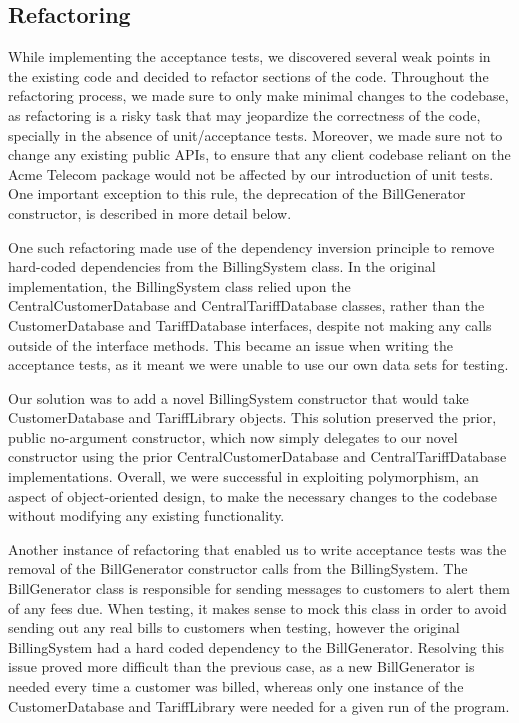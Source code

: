 \documentclass[a4paper]{article}
\begin{document}
\subsection{Refactoring}
While implementing the acceptance tests, we discovered several weak points in the existing code and decided to refactor sections of the code. Throughout the refactoring process, we made sure to only make minimal changes to the codebase, as refactoring is a risky task that may jeopardize the correctness of the code, specially in the absence of unit/acceptance tests. Moreover, we made sure not to change any existing public APIs, to ensure that any client codebase reliant on the Acme Telecom package would not be affected by our introduction of unit tests. One important exception to this rule, the deprecation of the BillGenerator constructor, is described in more detail below.

One such refactoring made use of the dependency inversion principle to remove hard-coded dependencies from the BillingSystem class. In the original implementation, the BillingSystem class relied upon the CentralCustomerDatabase and CentralTariffDatabase classes, rather than the CustomerDatabase and TariffDatabase interfaces, despite not making any calls outside of the interface methods. This became an issue when writing the acceptance tests, as it meant we were unable to use our own data sets for testing. 

Our solution was to add a novel BillingSystem constructor that would take CustomerDatabase and TariffLibrary objects. This solution preserved the prior, public no-argument constructor, which now simply delegates to our novel constructor using the prior CentralCustomerDatabase and CentralTariffDatabase implementations. Overall, we were successful in exploiting polymorphism, an aspect of object-oriented design, to make the necessary changes to the codebase without modifying any existing functionality.

Another instance of refactoring that enabled us to write acceptance tests was the removal of the BillGenerator constructor calls from the BillingSystem. The BillGenerator class is responsible for sending messages to customers to alert them of any fees due. When testing, it makes sense to mock this class in order to avoid sending out any real bills to customers when testing, however the original BillingSystem had a hard coded dependency to the BillGenerator. Resolving this issue proved more difficult than the previous case, as a new BillGenerator is needed every time a customer was billed, whereas only one instance of the CustomerDatabase and TariffLibrary were needed for a given run of the program. 
\end{document}
